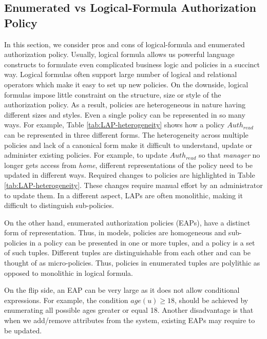 \subsection{Enumerated vs Logical-Formula Authorization Policy}
In this section, we consider pros and cons of logical-formula and enumerated   authorization policy. Usually, logical formula   allows us powerful language constructs to formulate even complicated business logic and policies in a succinct way. Logical formulas often support large number of logical and relational operators which make it easy to set up new policies. On the downside,  logical formulas impose little constraint on the structure, size or style of the authorization policy. As a result, policies are heterogeneous in nature having different sizes and styles. Even a single policy can be represented in so many ways.  For example, Table \ref{tab:LAP-heterogeneity} shows how a policy $Auth_{read}$ can  be represented in three different  forms. The heterogeneity across multiple policies and lack of a canonical form make it difficult to understand, update or administer existing policies.  For example, to update $Auth_{read}$ so that \textit{manager} no longer gets access from \textit{home}, different representations of the policy need to be updated in different ways. Required changes to policies are highlighted in Table \ref{tab:LAP-heterogeneity}. These changes require  manual effort  by an administrator to update them. In a different aspect, LAPs are often monolithic, making it difficult to distinguish sub-policies.




On the other hand, enumerated authorization policies (EAPs), have a distinct form of representation. Thus, in \EPModels{} models, policies are homogeneous and  sub-policies in a policy can be presented in one or more tuples, and a  policy is a set of such tuples. Different tuples are distinguishable from each other and can be thought of as micro-policies. Thus, policies in enumerated tuples are polylithic as opposed to monolithic in logical formula. 


On the flip side, an EAP can be very large as it  does not allow conditional expressions. For example, the  condition \textit{$age(u) \ge 18$}, should be achieved by enumerating all possible ages greater or equal 18. Another disadvantage  is that when we add/remove attributes from the system, existing EAPs may require to be updated. 

